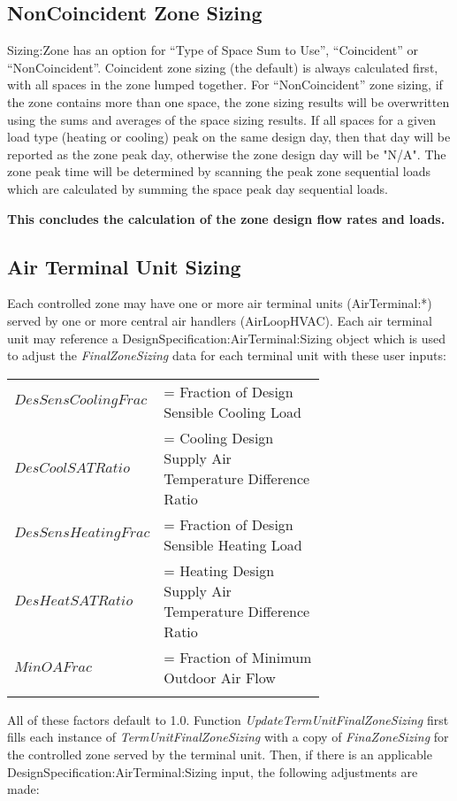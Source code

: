 \subsection{NonCoincident Zone Sizing}\label{noncoincident-zone-sizing}
Sizing:Zone has an option for  ``Type of Space Sum to Use'', ``Coincident'' or ``NonCoincident''. Coincident zone sizing (the default) is always calculated first, with all spaces in the zone lumped together. For ``NonCoincident'' zone sizing, if the zone contains more than one space, the zone sizing results will be overwritten using the sums and averages of the space sizing results. If all spaces for a given load type (heating or cooling) peak on the same design day, then that day will be reported as the zone peak day, otherwise the zone design day will be "N/A". The zone peak time will be determined by scanning the peak zone sequential loads which are calculated by summing the space peak day sequential loads.

\textbf{This concludes the calculation of the zone design flow rates and loads.}

\subsection{Air Terminal Unit Sizing}\label{air-terminal-unit-sizing}

Each controlled zone may have one or more air terminal units (AirTerminal:*) served by one or more central air handlers (AirLoopHVAC). Each air terminal unit may reference a DesignSpecification:AirTerminal:Sizing object which is used to adjust the \emph{FinalZoneSizing} data for each terminal unit with these user inputs:

\begin{tabular}{lp{0.7\linewidth}}
\\
		$DesSensCoolingFrac$ &= Fraction of Design Sensible Cooling Load\\
		$DesCoolSATRatio$ &= Cooling Design Supply Air Temperature Difference Ratio\\
		$DesSensHeatingFrac$ &= Fraction of Design Sensible Heating Load\\
		$DesHeatSATRatio$ &= Heating Design Supply Air Temperature Difference Ratio\\
	  $MinOAFrac$ &= Fraction of Minimum Outdoor Air Flow\\
\\
\end{tabular}

All of these factors default to 1.0. Function \emph{UpdateTermUnitFinalZoneSizing} first fills each instance of \emph{TermUnitFinalZoneSizing} with a copy of \emph{FinaZoneSizing} for the controlled zone served by the terminal unit. Then, if there is an applicable DesignSpecification:AirTerminal:Sizing input, the following adjustments are made:

